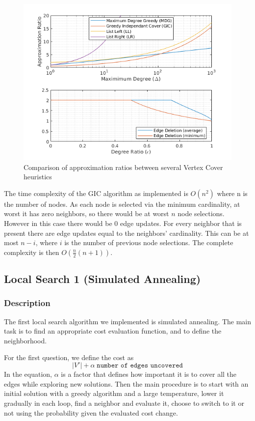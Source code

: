 \documentclass[acmlarge]{acmart}
\begin{document}
\begin{figure}[h]
	\centering
	\includegraphics[width=0.8\linewidth]{ApproxRatioComp.png}
	\caption{Comparison of approximation ratios between several Vertex Cover heuristics}
	\label{fig:approx_comp}
\end{figure}



The time complexity of the GIC algorithm as implemented is $O(n^2)$ where n is the number of nodes. As each node is selected via the minimum cardinality, at worst it has zero neighbors, so there would be at worst $n$ node selections. However in this case there would be 0 edge updates. For every neighbor that is present there are edge updates equal to the neighbors' cardinality. This can be at most $n-i$, where $i$ is the number of previous node selections. The complete complexity is then $O(\frac{n}{2}(n+1))$.

\subsection{Local Search 1 (Simulated Annealing)}

\subsubsection{Description}

The first local search algorithm we implemented is simulated annealing. The main task is to find an appropriate cost evaluation function, and to define the neighborhood.

For the first question, we define the cost as $$|V'|+\alpha\; \texttt{number of edges uncovered}$$ 
In the equation, $\alpha$ is a factor that defines how important it is to cover all the edges while exploring new solutions. Then the main procedure is to start with an initial solution with a greedy algorithm and a large temperature, lower it gradually in each loop, find a neighbor and evaluate it, choose to switch to it or not using the probability given the evaluated cost change.
\end{document}
